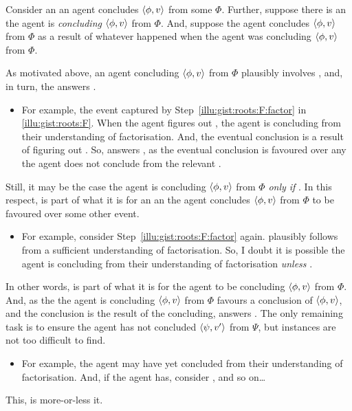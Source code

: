 \begin{note}
  Consider an  an agent concludes \(\langle\phi, v\rangle\) from some \pool{} \(\Phi\).
  Further, suppose there is an  the agent is \emph{concluding} \(\langle\phi, v\rangle\) from \(\Phi\).
  And, suppose the agent concludes \(\langle\phi, v\rangle\) from \(\Phi\) as a result of whatever happened when the agent was concluding \(\langle\phi, v\rangle\) from \(\Phi\).

  As motivated above, an agent concluding \(\langle\phi, v\rangle\) from \(\Phi\) plausibly involves , and, in turn, the \fingfr{} answers \qWhy{}.
  \begin{itemize}
  \item
    For example, the event captured by Step~\ref{illu:gist:roots:F:factor} in \autoref{illu:gist:roots:F}.
    When the agent figures out , the agent is concluding  from their understanding of factorisation.
    And, the eventual conclusion is a result of figuring out .
    So,  answers \qWhy{}, as the \agents{} eventual conclusion is favoured over any  the agent does not conclude  from the relevant \pool{}.
  \end{itemize}
  Still, it may be the case the agent is concluding \(\langle\phi, v\rangle\) from \(\Phi\) \emph{only if} .
  In this respect,  is part of what it is for an an  the agent concludes \(\langle\phi, v\rangle\) from \(\Phi\) to be favoured over some other event.
  \begin{itemize}
  \item
    For example, consider Step~\ref{illu:gist:roots:F:factor} again.
     plausibly follows from a sufficient understanding of factorisation.
    So, I doubt it is possible the agent is concluding  from their understanding of factorisation \emph{unless} .
  \end{itemize}
  In other words,  is part of what it is for the agent to be concluding \(\langle\phi, v\rangle\) from \(\Phi\).
  And, as the  the agent is concluding \(\langle\phi, v\rangle\) from \(\Phi\) favours a conclusion of \(\langle\phi, v\rangle\), and the conclusion is the result of the concluding,  answers \qWhy{}.
  The only remaining task is to ensure the agent has not concluded \(\langle\psi, v'\rangle\) from \(\Psi\), but instances are not too difficult to find.
  \begin{itemize}
  \item
    For example, the agent may have yet concluded  from their understanding of factorisation.
    And, if the agent has, consider , and so on\dots
  \end{itemize}
  This, is more-or-less it.


\end{note}
